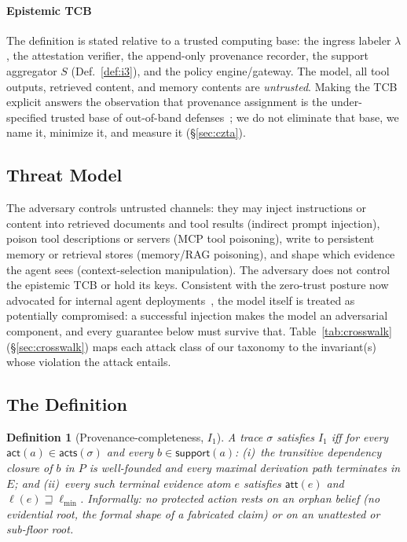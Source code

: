 \documentclass[conference]{IEEEtran}
\newtheorem{definition}{Definition}
\newcommand{\Ione}{\ensuremath{I_1}}
\newcommand{\att}{\ensuremath{\mathsf{att}}}
\newcommand{\support}{\ensuremath{\mathsf{support}}}
\newcommand{\acts}{\ensuremath{\mathsf{acts}}}
\newcommand{\ev}[1]{\ensuremath{\mathsf{#1}}}
\newcommand{\lmin}{\ensuremath{\ell_{\min}}}
\begin{document}
\paragraph*{Epistemic TCB}
The definition is stated relative to a trusted computing base: the
ingress labeler $\lambda$, the attestation verifier, the
append-only provenance recorder, the support aggregator $S$
(Def.~\ref{def:i3}), and the policy engine/gateway. The model, all
tool outputs, retrieved content, and memory contents are
\emph{untrusted}. Making the TCB explicit answers the observation
that provenance assignment is the under-specified trusted base of
out-of-band defenses~\cite{oob}; we do not eliminate that base, we
name it, minimize it, and measure it (\S\ref{sec:czta}).

\subsection{Threat Model}
\label{sec:threat}
The adversary controls untrusted channels: they may inject
instructions or content into retrieved documents and tool results
(indirect prompt injection), poison tool descriptions or servers
(MCP tool poisoning), write to persistent memory or retrieval
stores (memory/RAG poisoning), and shape which evidence the agent
sees (context-selection manipulation). The adversary does not
control the epistemic TCB or hold its keys. Consistent with the
zero-trust posture now advocated for internal agent
deployments~\cite{controlroadmap}, the model itself is treated as
potentially compromised: a successful injection makes the model an
adversarial component, and every guarantee below must survive
that. Table~\ref{tab:crosswalk} (\S\ref{sec:crosswalk}) maps each
attack class of our taxonomy to the invariant(s) whose violation
the attack entails.

\subsection{The Definition}
\begin{definition}[Provenance-completeness, \Ione]
A trace $\sigma$ satisfies \Ione{} iff for every
$\ev{act}(a) \in \acts(\sigma)$ and every $b \in \support(a)$:
(i)~the transitive dependency closure of $b$ in $P$ is
well-founded and every maximal derivation path terminates in $E$;
and (ii)~every such terminal evidence atom $e$ satisfies $\att(e)$
and $\ell(e) \sqsupseteq \lmin$. Informally: no protected action
rests on an orphan belief (no evidential root, the formal shape
of a fabricated claim) or on an unattested or sub-floor root.
\end{definition}
\end{document}
